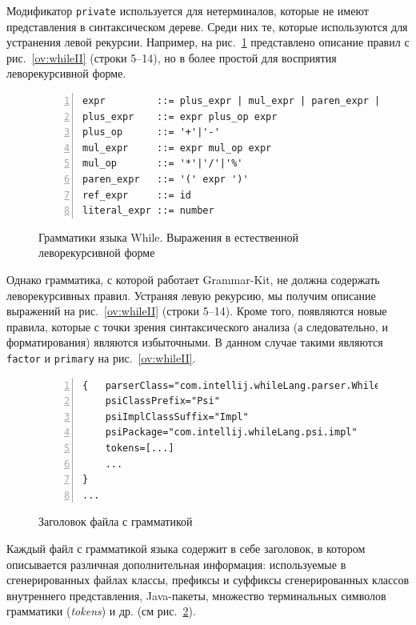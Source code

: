 Модификатор \lstinline{private} используется для нетерминалов, которые не имеют представления в синтаксическом дереве.
Среди них те, которые используются для устранения левой рекурсии.
Например, на рис.~\ref{ov:whileExpr} представлено описание правил с рис.~\ref{ov:whileII} (строки 5--14), но в более простой
для восприятия леворекурсивной форме.
\begin{figure}[h]
    \begin{lstlisting}[numbers=left, numbersep=3pt, basicstyle=\ttfamily\small, numberstyle=\tiny, frame=bottom, language={}]
expr         ::= plus_expr | mul_expr | paren_expr | ref_expr | literal_expr
plus_expr    ::= expr plus_op expr
plus_op      ::= '+'|'-'
mul_expr     ::= expr mul_op expr
mul_op       ::= '*'|'/'|'%'
paren_expr   ::= '(' expr ')'
ref_expr     ::= id
literal_expr ::= number
    \end{lstlisting}
    \caption{Грамматики языка While. Выражения в естественной леворекурсивной форме}
    \label{ov:whileExpr}
\end{figure}
\noindent
Однако грамматика, с которой работает Grammar-Kit, не должна содержать леворекурсивных правил.
Устраняя левую рекурсию, мы получим описание выражений на рис.~\ref{ov:whileII} (строки 5--14).
Кроме того, появляются новые правила, которые с точки зрения синтаксического анализа (а следовательно, и форматирования) являются избыточными.
В данном случае такими являются \lstinline{factor} и \lstinline{primary} на рис.~\ref{ov:whileII}.
\begin{figure}[b]
    \begin{lstlisting}[numbers=left, numbersep=3pt, basicstyle=\ttfamily\small, numberstyle=\tiny, frame=bottom, language={}]
{   parserClass="com.intellij.whileLang.parser.WhileParser"
    psiClassPrefix="Psi"
    psiImplClassSuffix="Impl"
    psiPackage="com.intellij.whileLang.psi.impl"
    tokens=[...]
    ...
}
...
    \end{lstlisting}
    \caption{Заголовок файла с грамматикой}
    \label{ov:whileIII}
\end{figure}
Каждый файл с грамматикой языка содержит в себе заголовок, в котором описывается различная дополнительная информация: используемые в сгенерированных файлах классы, префиксы и суффиксы сгенерированных классов внутреннего представления, Java-пакеты, множество терминальных символов грамматики (\emph{tokens}) и др. (см рис.~\ref{ov:whileIII}).




